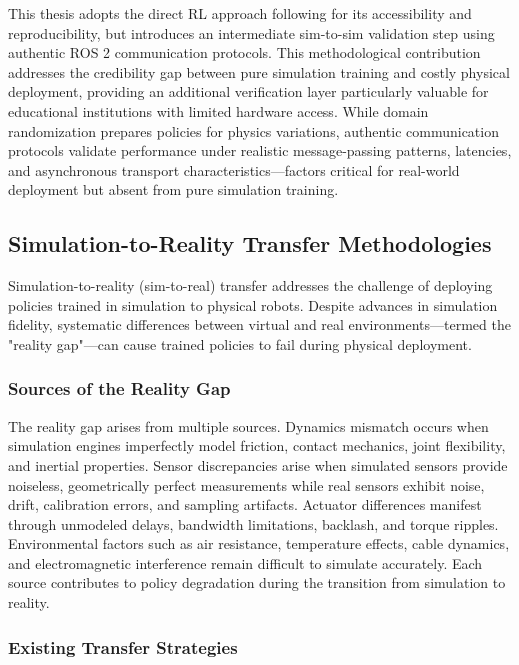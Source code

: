 \documentclass[12pt,a4paper]{article}
\begin{document}
This thesis adopts the direct RL approach following \textcite{gu2024humanoidgym} for its accessibility and reproducibility, but introduces an intermediate sim-to-sim validation step using authentic ROS 2 communication protocols. This methodological contribution addresses the credibility gap between pure simulation training and costly physical deployment, providing an additional verification layer particularly valuable for educational institutions with limited hardware access. While domain randomization prepares policies for physics variations, authentic communication protocols validate performance under realistic message-passing patterns, latencies, and asynchronous transport characteristics—factors critical for real-world deployment but absent from pure simulation training.

\subsection{Simulation-to-Reality Transfer Methodologies}

Simulation-to-reality (sim-to-real) transfer addresses the challenge of deploying policies trained in simulation to physical robots. Despite advances in simulation fidelity, systematic differences between virtual and real environments—termed the "reality gap"—can cause trained policies to fail during physical deployment.

\subsubsection{Sources of the Reality Gap}

The reality gap arises from multiple sources. Dynamics mismatch occurs when simulation engines imperfectly model friction, contact mechanics, joint flexibility, and inertial properties. Sensor discrepancies arise when simulated sensors provide noiseless, geometrically perfect measurements while real sensors exhibit noise, drift, calibration errors, and sampling artifacts. Actuator differences manifest through unmodeled delays, bandwidth limitations, backlash, and torque ripples. Environmental factors such as air resistance, temperature effects, cable dynamics, and electromagnetic interference remain difficult to simulate accurately. Each source contributes to policy degradation during the transition from simulation to reality.

\subsubsection{Existing Transfer Strategies}
\end{document}
